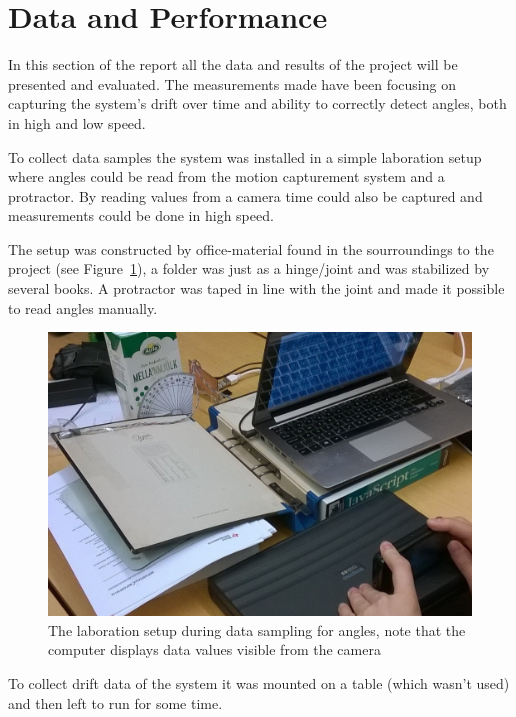 \documentclass[a4paper, 12pt]{article}
\begin{document}
\section*{Data and Performance}
In this section of the report all the data and results of the project will be presented and evaluated. The measurements made have been focusing on capturing the system's drift over time and ability to correctly detect angles, both in high and low speed.

To collect data samples the system was installed in a simple laboration setup where angles could be read from the motion capturement system and a protractor. By reading values from a camera time could also be captured and measurements could be done in high speed. 

The setup was constructed by office-material found in the sourroundings to the project (see Figure~\ref{fig:pic7}), a folder was just as a hinge/joint and was stabilized by several books. A protractor was taped in line with the joint and made it possible to read angles manually. 

\begin{figure}[h!]
    \centering
    \includegraphics[scale=0.27]{croped.jpg}
    \caption{The laboration setup during data sampling for angles, note that the computer displays data values visible from the camera}
    \label{fig:pic7}
\end{figure}

To collect drift data of the system it was mounted on a table (which wasn't used) and then left to run for some time.  
\end{document}
